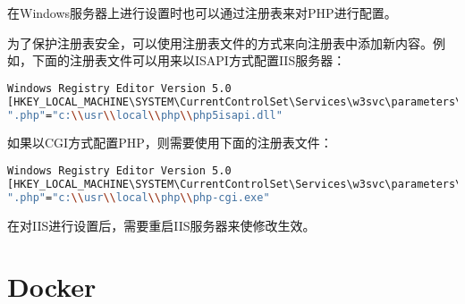 在Windows服务器上进行设置时也可以通过注册表来对PHP进行配置。

为了保护注册表安全，可以使用注册表文件的方式来向注册表中添加新内容。例如，下面的注册表文件可以用来以ISAPI方式配置IIS服务器：


\begin{lstlisting}[language=bash]
Windows Registry Editor Version 5.0
[HKEY_LOCAL_MACHINE\SYSTEM\CurrentControlSet\Services\w3svc\parameters\Script Map]
".php"="c:\\usr\\local\\php\\php5isapi.dll"
\end{lstlisting}

如果以CGI方式配置PHP，则需要使用下面的注册表文件：




\begin{lstlisting}[language=bash]
Windows Registry Editor Version 5.0
[HKEY_LOCAL_MACHINE\SYSTEM\CurrentControlSet\Services\w3svc\parameters\Script Map]
".php"="c:\\usr\\local\\php\\php-cgi.exe"
\end{lstlisting}

在对IIS进行设置后，需要重启IIS服务器来使修改生效。

\section{Docker}



\begin{lstlisting}[language=bash]

\end{lstlisting}




\begin{lstlisting}[language=bash]

\end{lstlisting}





\begin{lstlisting}[language=bash]

\end{lstlisting}





\begin{lstlisting}[language=bash]

\end{lstlisting}





